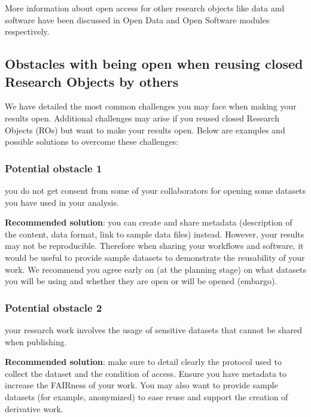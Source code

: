 \documentclass[
  letterpaper,
  DIV=11,
  numbers=noendperiod]{scrreport}
\begin{document}
More information about open access for other research objects like data
and software have been discussed in Open Data and Open Software modules
respectively.

\hypertarget{obstacles-with-being-open-when-reusing-closed-research-objects-by-others}{%
\subsection{Obstacles with being open when reusing closed Research
Objects by
others}\label{obstacles-with-being-open-when-reusing-closed-research-objects-by-others}}

We have detailed the most common challenges you may face when making
your results open. Additional challenges may arise if you reused closed
Research Objects (ROs) but want to make your results open. Below are
examples and possible solutions to overcome these challenges:

\hypertarget{potential-obstacle-1}{%
\subsubsection{Potential obstacle 1}\label{potential-obstacle-1}}

you do not get consent from some of your collaborators for opening some
datasets you have used in your analysis.

\textbf{Recommended solution}: you can create and share metadata
(description of the content, data format, link to sample data files)
instead. However, your results may not be reproducible. Therefore when
sharing your workflows and software, it would be useful to provide
sample datasets to demonstrate the reusability of your work. We
recommend you agree early on (at the planning stage) on what datasets
you will be using and whether they are open or will be opened (embargo).

\hypertarget{potential-obstacle-2}{%
\subsubsection{Potential obstacle 2}\label{potential-obstacle-2}}

your research work involves the usage of sensitive datasets that cannot
be shared when publishing.

\textbf{Recommended solution}: make sure to detail clearly the protocol
used to collect the dataset and the condition of access. Ensure you have
metadata to increase the FAIRness of your work. You may also want to
provide sample datasets (for example, anonymized) to ease reuse and
support the creation of derivative work.
\end{document}
